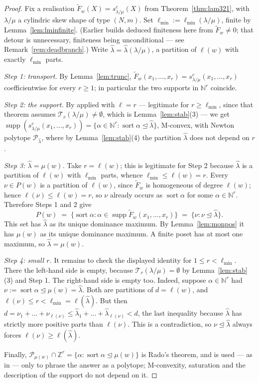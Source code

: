 \documentclass[11pt]{article}
\theoremstyle{plain}
\theoremstyle{definition}
\DeclareMathOperator{\supp}{supp}
\DeclareMathOperator{\sort}{sort}
\newcommand{\Z}{\mathbb{Z}}
\newcommand{\N}{\mathbb{N}}
\newcommand{\Fw}{\widetilde{F}_{w}}
\newcommand{\Perm}{\mathcal{P}}
\begin{document}
\begin{proof}
Fix a realisation $\Fw(X)=s^{c}_{\lambda/\mu}(X)$ from Theorem~\ref{thm:lam321}, with
$\lambda/\mu$ a cylindric skew shape of type $(N,m)$. Set
$\ell_{\min}:=\ell_{\min}(\lambda/\mu)$, finite by Lemma~\ref{lem:lminfinite}. (Earlier builds
deduced finiteness here from $\Fw\ne0$; that detour is unnecessary, finiteness being
unconditional --- see Remark~\ref{rem:deadbranch}.) Write
$\hat\lambda=\hat\lambda(\lambda/\mu)$, a partition of $\ell(w)$ with exactly $\ell_{\min}$
parts.

\emph{Step 1: transport.} By Lemma~\ref{lem:trunc},
$\Fw(x_1,\dots,x_r)=s^{c}_{\lambda/\mu}(x_1,\dots,x_r)$ coefficientwise for every $r\ge1$; in
particular the two supports in $\N^r$ coincide.

\emph{Step 2: the support.} By \cite[Thm.~7.1]{Clio2026} applied with $\ell=r$ --- legitimate
for $r\ge\ell_{\min}$, since that theorem assumes $\mathcal T_r(\lambda/\mu)\ne\emptyset$,
which is Lemma~\ref{lem:stab}(3) --- we get
$\supp(s^{c}_{\lambda/\mu}(x_1,\dots,x_r))=\{\alpha\in\N^{r}:\sort\alpha\trianglelefteq\hat\lambda\}$,
M-convex, with Newton polytope $\Perm_{\hat\lambda}$, where by Lemma~\ref{lem:stab}(4) the
partition $\hat\lambda$ does not depend on $r$.

\emph{Step 3: $\hat\lambda=\mu(w)$.} Take $r=\ell(w)$; this is legitimate for Step 2 because
$\hat\lambda$ is a partition of $\ell(w)$ with $\ell_{\min}$ parts, whence
$\ell_{\min}\le\ell(w)=r$. Every $\nu\in P(w)$ is a partition of $\ell(w)$, since $\Fw$ is
homogeneous of degree $\ell(w)$; hence $\ell(\nu)\le\ell(w)=r$, so $\nu$ already occurs as
$\sort\alpha$ for some $\alpha\in\N^{r}$. Therefore Steps 1 and 2 give
\[
  P(w)\;=\;\{\sort\alpha:\alpha\in\supp\Fw(x_1,\dots,x_r)\}\;=\;\{\nu:\nu\trianglelefteq\hat\lambda\}.
\]
This set has $\hat\lambda$ as its unique dominance maximum. By Lemma~\ref{lem:monpos} it has
$\mu(w)$ as its unique dominance maximum. A finite poset has at most one maximum, so
$\hat\lambda=\mu(w)$.

\emph{Step 4: small $r$.} It remains to check the displayed identity for
$1\le r<\ell_{\min}$. There the left-hand side is empty, because
$\mathcal T_r(\lambda/\mu)=\emptyset$ by Lemma~\ref{lem:stab}(3) and Step 1. The right-hand
side is empty too. Indeed, suppose $\alpha\in\N^r$ had
$\nu:=\sort\alpha\trianglelefteq\mu(w)=\hat\lambda$. Both are partitions of $d=\ell(w)$, and
$\ell(\nu)\le r<\ell_{\min}=\ell(\hat\lambda)$. But then
$d=\nu_1+\dots+\nu_{\ell(\nu)}\le\hat\lambda_1+\dots+\hat\lambda_{\ell(\nu)}<d$, the last
inequality because $\hat\lambda$ has strictly more positive parts than $\ell(\nu)$. This is a
contradiction, so $\nu\trianglelefteq\hat\lambda$ always forces $\ell(\nu)\ge\ell(\hat\lambda)$.

Finally, $\Perm_{\mu(w)}\cap\Z^r=\{\alpha:\sort\alpha\trianglelefteq\mu(w)\}$ is Rado's
theorem, and is used --- as in \cite[Thm.~7.1]{Clio2026} --- only to phrase the answer as a
polytope; M-convexity, saturation and the description of the support do not depend on it.
\end{proof}
\end{document}
